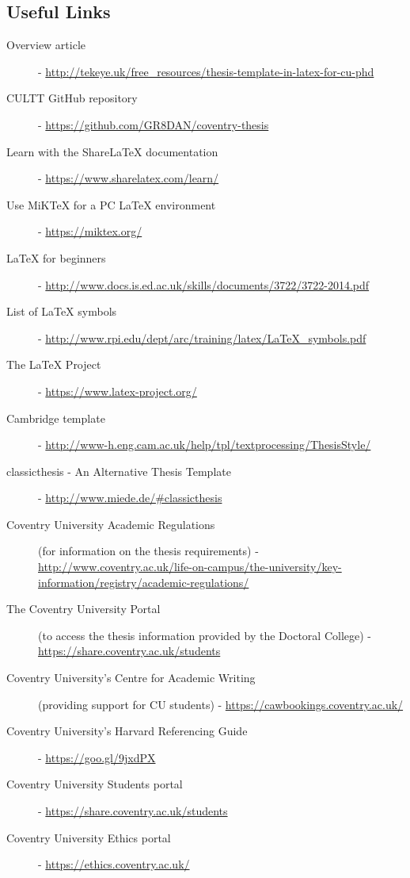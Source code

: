 \subsection*{Useful Links}
\begin{description}
\item[Overview article] - \url{http://tekeye.uk/free_resources/thesis-template-in-latex-for-cu-phd}
\item[CULTT GitHub repository] - \url{https://github.com/GR8DAN/coventry-thesis}
\item[Learn with the ShareLaTeX documentation] - \url{https://www.sharelatex.com/learn/}
\item[Use MiKTeX for a PC \LaTeX{} environment] - \url{https://miktex.org/}
\item[\LaTeX{} for beginners] - \url{http://www.docs.is.ed.ac.uk/skills/documents/3722/3722-2014.pdf}
\item[List of LaTeX symbols] - \url{http://www.rpi.edu/dept/arc/training/latex/LaTeX_symbols.pdf}
\item[The \LaTeX{} Project] - \url{https://www.latex-project.org/}
\item[Cambridge template] - \url{http://www-h.eng.cam.ac.uk/help/tpl/textprocessing/ThesisStyle/}
\item[classicthesis - An Alternative Thesis Template] - \url{http://www.miede.de/#classicthesis}
\item[Coventry University Academic Regulations] (for information on the thesis requirements)
- \url{http://www.coventry.ac.uk/life-on-campus/the-university/key-information/registry/academic-regulations/}
\item[The Coventry University Portal] (to access the thesis information provided by the Doctoral College)
- \url{https://share.coventry.ac.uk/students}
\item[Coventry University's Centre for Academic Writing] (providing support for CU students) - \url{https://cawbookings.coventry.ac.uk/}
\item[Coventry University's Harvard Referencing Guide]
- \url{https://goo.gl/9jxdPX}
\item[Coventry University Students portal] - \url{https://share.coventry.ac.uk/students}
\item[Coventry University Ethics portal] - \url{https://ethics.coventry.ac.uk/}
\end{description}
